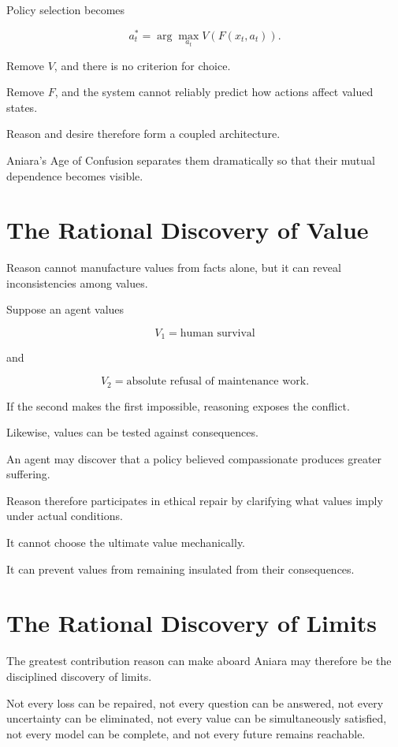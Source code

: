 \documentclass[11pt,oneside]{book}
\theoremstyle{definition}
\theoremstyle{remark}
\begin{document}
Policy selection becomes

\[
a_t^\ast
=
\arg\max_{a_t}
V(F(x_t,a_t)).
\]

Remove \(V\), and there is no criterion for choice.

Remove \(F\), and the system cannot reliably predict how actions affect valued states.

Reason and desire therefore form a coupled architecture.

Aniara's Age of Confusion separates them dramatically so that their mutual dependence becomes visible.

\section{The Rational Discovery of Value}

Reason cannot manufacture values from facts alone, but it can reveal inconsistencies among values.

Suppose an agent values

\[
V_1=\text{human survival}
\]

and

\[
V_2=\text{absolute refusal of maintenance work}.
\]

If the second makes the first impossible, reasoning exposes the conflict.

Likewise, values can be tested against consequences.

An agent may discover that a policy believed compassionate produces greater suffering.

Reason therefore participates in ethical repair by clarifying what values imply under actual conditions.

It cannot choose the ultimate value mechanically.

It can prevent values from remaining insulated from their consequences.

\section{The Rational Discovery of Limits}

The greatest contribution reason can make aboard Aniara may therefore be the disciplined discovery of limits.

Not every loss can be repaired, not every question can be answered, not every uncertainty can be eliminated, not every value can be simultaneously satisfied, not every model can be complete, and not every future remains reachable.
\end{document}
